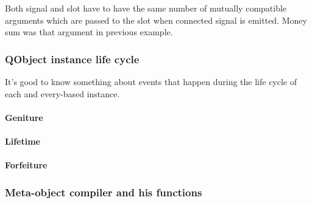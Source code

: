 Both signal and slot have to have the same number of mutually compatible arguments which are passed to the slot when connected signal is emitted. Money sum was that argument in previous example.


\subsubsection{QObject instance life cycle}
It's good to know something about events that happen during the life cycle of each and every-based instance.

\paragraph*{Geniture}

\paragraph*{Lifetime}

\paragraph*{Forfeiture}


\subsubsection{Meta-object compiler and his functions}\label{section:mocfun}